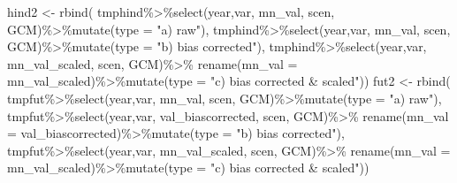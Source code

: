 \documentclass[
]{article}
\newenvironment{Shaded}{\begin{snugshade}}{\end{snugshade}}
\newcommand{\AttributeTok}[1]{\textcolor[rgb]{0.77,0.63,0.00}{#1}}
\newcommand{\FunctionTok}[1]{\textcolor[rgb]{0.00,0.00,0.00}{#1}}
\newcommand{\NormalTok}[1]{#1}
\newcommand{\OtherTok}[1]{\textcolor[rgb]{0.56,0.35,0.01}{#1}}
\newcommand{\SpecialCharTok}[1]{\textcolor[rgb]{0.00,0.00,0.00}{#1}}
\newcommand{\StringTok}[1]{\textcolor[rgb]{0.31,0.60,0.02}{#1}}
\begin{document}
\begin{Shaded}
\begin{Highlighting}[]
\NormalTok{          hind2 }\OtherTok{\textless{}{-}} \FunctionTok{rbind}\NormalTok{(}
\NormalTok{            tmphind}\SpecialCharTok{\%\textgreater{}\%}\FunctionTok{select}\NormalTok{(year,var, mn\_val, scen, GCM)}\SpecialCharTok{\%\textgreater{}\%}\FunctionTok{mutate}\NormalTok{(}\AttributeTok{type =} \StringTok{"a) raw"}\NormalTok{),}
\NormalTok{            tmphind}\SpecialCharTok{\%\textgreater{}\%}\FunctionTok{select}\NormalTok{(year,var, mn\_val, scen, GCM)}\SpecialCharTok{\%\textgreater{}\%}\FunctionTok{mutate}\NormalTok{(}\AttributeTok{type =} \StringTok{"b) bias corrected"}\NormalTok{),}
\NormalTok{            tmphind}\SpecialCharTok{\%\textgreater{}\%}\FunctionTok{select}\NormalTok{(year,var, mn\_val\_scaled, scen, GCM)}\SpecialCharTok{\%\textgreater{}\%}
              \FunctionTok{rename}\NormalTok{(}\AttributeTok{mn\_val =}\NormalTok{ mn\_val\_scaled)}\SpecialCharTok{\%\textgreater{}\%}\FunctionTok{mutate}\NormalTok{(}\AttributeTok{type =} \StringTok{"c) bias corrected \&  scaled"}\NormalTok{))}
\NormalTok{          fut2 }\OtherTok{\textless{}{-}} \FunctionTok{rbind}\NormalTok{(}
\NormalTok{            tmpfut}\SpecialCharTok{\%\textgreater{}\%}\FunctionTok{select}\NormalTok{(year,var, mn\_val, scen, GCM)}\SpecialCharTok{\%\textgreater{}\%}\FunctionTok{mutate}\NormalTok{(}\AttributeTok{type =} \StringTok{"a) raw"}\NormalTok{),}
\NormalTok{            tmpfut}\SpecialCharTok{\%\textgreater{}\%}\FunctionTok{select}\NormalTok{(year,var, val\_biascorrected, scen, GCM)}\SpecialCharTok{\%\textgreater{}\%}
              \FunctionTok{rename}\NormalTok{(}\AttributeTok{mn\_val =}\NormalTok{ val\_biascorrected)}\SpecialCharTok{\%\textgreater{}\%}\FunctionTok{mutate}\NormalTok{(}\AttributeTok{type =} \StringTok{"b) bias corrected"}\NormalTok{),}
\NormalTok{            tmpfut}\SpecialCharTok{\%\textgreater{}\%}\FunctionTok{select}\NormalTok{(year,var, mn\_val\_scaled, scen, GCM)}\SpecialCharTok{\%\textgreater{}\%}
              \FunctionTok{rename}\NormalTok{(}\AttributeTok{mn\_val =}\NormalTok{ mn\_val\_scaled)}\SpecialCharTok{\%\textgreater{}\%}\FunctionTok{mutate}\NormalTok{(}\AttributeTok{type =} \StringTok{"c) bias corrected \&  scaled"}\NormalTok{))}
         

\end{Highlighting}
\end{Shaded}
\end{document}
